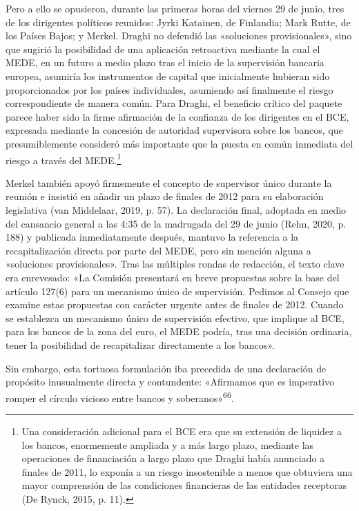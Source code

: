 \documentclass[10pt,a4paper]{article}
\begin{document}
{Pero a ello se opusieron, durante las primeras horas del viernes 29 de junio, tres de los dirigentes políticos reunidos: Jyrki Katainen, de Finlandia; Mark Rutte, de los Países Bajos; y Merkel. Draghi no defendió las «soluciones provisionales», sino que sugirió la posibilidad de una aplicación retroactiva mediante la cual el MEDE, en un futuro a medio plazo tras el inicio de la supervisión bancaria europea, asumiría los instrumentos de capital que inicialmente hubieran sido proporcionados por los países individuales, asumiendo así finalmente el riesgo correspondiente de manera común. Para Draghi, el beneficio crítico del paquete parece haber sido la firme afirmación de la confianza de los dirigentes en el BCE, expresada mediante la concesión de autoridad supervisora sobre los bancos, que presumiblemente consideró más importante que la puesta en común inmediata del riesgo a través del MEDE.\footnote{%
    Una consideración adicional para el BCE era que su extensión de liquidez a los bancos, enormemente ampliada y a más largo plazo, mediante las operaciones de financiación a largo plazo que Draghi había anunciado a finales de 2011, lo exponía a un riesgo insostenible a menos que obtuviera una mayor comprensión de las condiciones financieras de las entidades receptoras (De Rynck, 2015, p. 11).
}

Merkel también apoyó firmemente el concepto de supervisor único durante la reunión e insistió en añadir un plazo de finales de 2012 para su elaboración legislativa (van Middelaar, 2019, p. 57). La declaración final, adoptada en medio del cansancio general a las 4:35 de la madrugada del 29 de junio (Rehn, 2020, p. 188) y publicada inmediatamente después, mantuvo la referencia a la recapitalización directa por parte del MEDE, pero sin mención alguna a «soluciones provisionales». Tras las múltiples rondas de redacción, el texto clave era enrevesado: «La Comisión presentará en breve propuestas sobre la base del artículo 127(6) para un mecanismo único de supervisión. Pedimos al Consejo que examine estas propuestas con carácter urgente antes de finales de 2012. Cuando se establezca un mecanismo único de supervisión efectivo, que implique al BCE, para los bancos de la zona del euro, el MEDE podría, tras una decisión ordinaria, tener la posibilidad de recapitalizar directamente a los bancos».

Sin embargo, esta tortuosa formulación iba precedida de una declaración de propósito inusualmente directa y contundente: «Afirmamos que es imperativo romper el círculo vicioso entre bancos y soberanos»\textsuperscript{66}.

}
\end{document}
